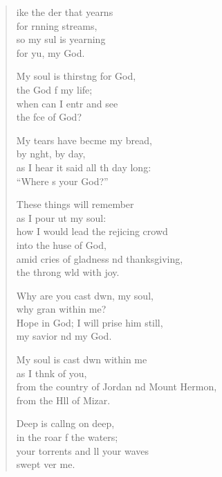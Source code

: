 \settowidth{\versewidth}{from the country of Jordan and Mount Hermon, *}
\begin{verse}%
  \begin{patverse}
ike the der that yearns\Med\\
for rnning streams,\\
so my sul is yearning\Med\\
for yu, my God.

My soul is thirst\pointup{\i}ng for God,\Med\\
the God f my life;\\
when can I entr and see\Med\\
the fce of God?

My tears have becme my bread,\Med\\
by n\pointup{\i}ght, by day,\\
as I hear it said all th day long:\Med\\
“Where \pointup{\i}s your God?”

These things will  remember\Med\\
as I pour ut my soul:\\
how I would lead the rejicing crowd\Med\\
into the huse of God,\\
amid cries of gladness nd thanksgiving,\Med\\
the throng w\pointup{\i}ld with joy.

Why are you cast dwn, my soul,\Med\\
why gran within me?\\
Hope in God; I will prise him still,\Med\\
my savior nd my God.

My soul is cast dwn within me\Med\\
as I th\pointup{\i}nk of you,\\
from the country of Jordan nd Mount Hermon,\Med\\
from the H\pointup{\i}ll of Mizar.

Deep is call\pointup{\i}ng on deep,\Med\\
in the roar f the waters;\\
your torrents and ll your waves\Med\\
swept ver me.


\end{patverse}
\end{verse}
